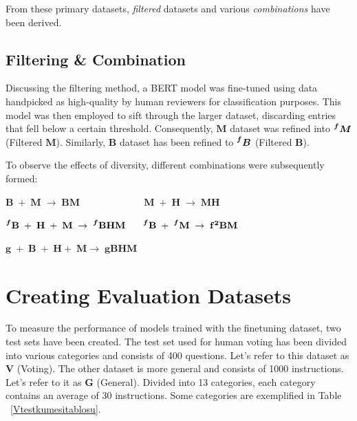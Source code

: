 \documentclass[conference]{IEEEtran}
\begin{document}
From these primary datasets, \textit{filtered} datasets and various \textit{combinations} have been derived.

\subsection{Filtering \& Combination}
Discussing the filtering method, a BERT\cite{toprak2023developing} model was fine-tuned using data handpicked as high-quality by human reviewers for classification purposes. This model was then employed to sift through the larger dataset, discarding entries that fell below a certain threshold. Consequently, $\mathbf{M}$ dataset was refined into $\prescript{\bm{f}}{}{\bm{M}}$ (Filtered $\mathbf{M}$). Similarly, $\mathbf{B}$ dataset has been refined to $\prescript{\bm{f}}{}{\bm{B}}$ (Filtered $\mathbf{B}$). \newline

To observe the effects of diversity, different combinations were subsequently formed: \newline

\small{
 $ \mathbf{ 
    B \; + \; M \; \rightarrow  \; BM     \; \; \; \; \; \;  \; \; \; \; \; \; \; \; \; \; \; \; \; \; \; \; \; \;
    M \; + \; H \; \rightarrow  \; MH
    }
 $
} 

\vspace{0.5\baselineskip}

\small{
 $ \mathbf{ 
    \prescript{\bm{f}}{}{\bm{B}} \; + \; H \; + \; M \; \rightarrow \; \prescript{\bm{f}}{}{\bm{B}}HM 
    \; \; \; \; \; \;
    \prescript{\bm{f}}{}{\bm{B}} \; + \; \prescript{\bm{f}}{}{\bm{M}} \; \rightarrow \; f^2 BM
    }
 $
}
\vspace{0.5\baselineskip}

\small{
 $ \mathbf{ 
        g \; + \; B \; + \; H + \; M \rightarrow\; gBHM
    }
 $
} \newline


\section{Creating Evaluation Datasets}

To measure the performance of models trained with the finetuning dataset, two test sets have been created. The test set used for human voting has been divided into various categories and consists of 400 questions. Let's refer to this dataset as $\bm{V}$ (Voting). The other dataset is more general and consists of 1000 instructions. Let's refer to it as $\bm{G}$ (General). Divided into 13 categories, each category contains an average of 30 instructions. 
Some categories are exemplified in Table ~\ref{Vtestkumesitablosu}. 
\end{document}
